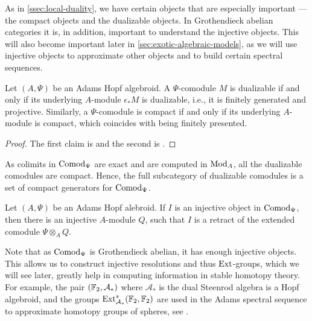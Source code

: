 As in \cref{ssec:local-duality}, we have certain objects that are especially important --- the compact objects and the dualizable objects. In Grothendieck abelian categories it is, in addition, important to understand the injective objects. This will also become important later in \cref{sec:exotic-algebraic-models}, as we will use injective objects to approximate other objects and to build certain spectral sequences.  

\begin{proposition}
    \label{rm:dualizable/compact-comodules}
    Let $(A, \Psi)$ be an Adams Hopf algebroid. A $\Psi$-comodule $M$ is dualizable if and only if its underlying $A$-module $\epsilon_* M$ is dualizable, i.e., it is finitely generated and projective. Similarly, a $\Psi$-comodule is compact if and only if its underlying $A$-module is compact, which coincides with being finitely presented. 
\end{proposition}
\begin{proof}
    The first claim is \cite[1.3.4]{hovey_04} and the second is \cite[1.4.2]{hovey_04}. 
\end{proof}

\begin{remark}
    \label{rm:dualizables-compact-generators}
    As colimits in $\mathrm{Comod}_\Psi$ are exact and are computed in $\mathrm{Mod}_A$, all the dualizable comodules are compact. Hence, the full subcategory of dualizable comodules is a set of compact generators for $\mathrm{Comod}_\Psi$. 
\end{remark}

\begin{proposition}
    \label{rm:injective-comodules}
    Let $(A, \Psi)$ be an Adams Hopf alebroid. If $I$ is an injective object in $\mathrm{Comod}_\Psi$, then there is an injective $A$-module $Q$, such that $I$ is a retract of the extended comodule $\Psi\otimes_A Q$. 
\end{proposition}

\begin{remark}
    Note that as $\mathrm{Comod}_{\Psi}$ is Grothendieck abelian, it has enough injective objects. This allows us to construct injective resolutions and thus $\operatorname{Ext}$-groups, which we will see later, greatly help in computing information in stable homotopy theory. For example, the pair $(\mathbb{F}_2, \mathcal{A}_*)$ where $\mathcal{A}_*$ is the dual Steenrod algebra is a Hopf algebroid, and the groups $\operatorname{Ext}^s_{\mathcal{A}_*}(\mathbb{F}_2, \mathbb{F}_2)$ are used in the Adams spectral sequence to approximate homotopy groups of spheres, see \cite{adams_58}. 
\end{remark}

